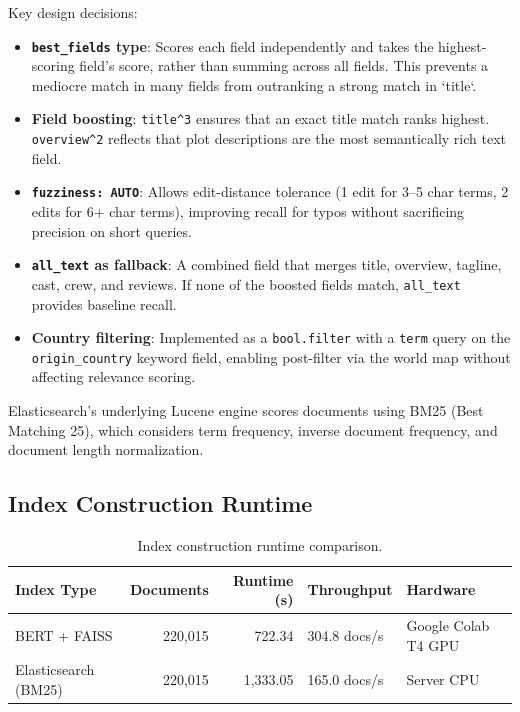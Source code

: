 \documentclass[11pt,a4paper]{article}
\begin{document}
\noindent Key design decisions:

\begin{itemize}[nosep]
  \item \textbf{\texttt{best\_fields} type}: Scores each field independently and takes the highest-scoring field's score, rather than summing across all fields. This prevents a mediocre match in many fields from outranking a strong match in `title`.
  \item \textbf{Field boosting}: \texttt{title\^{}3} ensures that an exact title match ranks highest. \texttt{overview\^{}2} reflects that plot descriptions are the most semantically rich text field.
  \item \textbf{\texttt{fuzziness: AUTO}}: Allows edit-distance tolerance (1 edit for 3--5 char terms, 2 edits for 6+ char terms), improving recall for typos without sacrificing precision on short queries.
  \item \textbf{\texttt{all\_text} as fallback}: A combined field that merges title, overview, tagline, cast, crew, and reviews. If none of the boosted fields match, \texttt{all\_text} provides baseline recall.
  \item \textbf{Country filtering}: Implemented as a \texttt{bool.filter} with a \texttt{term} query on the \texttt{origin\_country} keyword field, enabling post-filter via the world map without affecting relevance scoring.
\end{itemize}

\noindent Elasticsearch's underlying Lucene engine scores documents using BM25 (Best Matching 25), which considers term frequency, inverse document frequency, and document length normalization.

\subsection{Index Construction Runtime}
\label{sec:runtime}

\begin{table}[H]
\centering
\begin{tabular}{@{}lrrll@{}}
\toprule
\textbf{Index Type} & \textbf{Documents} & \textbf{Runtime (s)} & \textbf{Throughput} & \textbf{Hardware} \\
\midrule
BERT + FAISS & 220,015 & 722.34 & 304.8 docs/s & Google Colab T4 GPU \\
Elasticsearch (BM25) & 220,015 & 1,333.05 & 165.0 docs/s & Server CPU \\
\bottomrule
\end{tabular}
\caption{Index construction runtime comparison.}
\label{tab:runtime}
\end{table}
\end{document}
